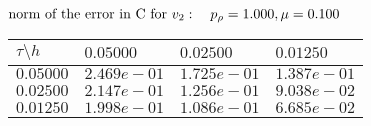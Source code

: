 $
 \text{norm of the error in C for $v_2$}: \quad p_{\rho}=1.000, \mu = 0.100 \\ $
\begin{tabular}{|p{0.6in}|p{1.2in}|p{1.2in}|p{1.2in}|} \hline
$\tau\setminus h$ & $0.05000$ & $0.02500$& $0.01250$ \\ \hline
$0.05000$ & $2.469e-01$ &$1.725e-01$ &$1.387e-01$  \\ \hline
$0.02500$ & $2.147e-01$ &$1.256e-01$ &$9.038e-02$  \\ \hline
$0.01250$ & $1.998e-01$ &$1.086e-01$ &$6.685e-02$  \\ \hline
\end{tabular}\\[20pt]
